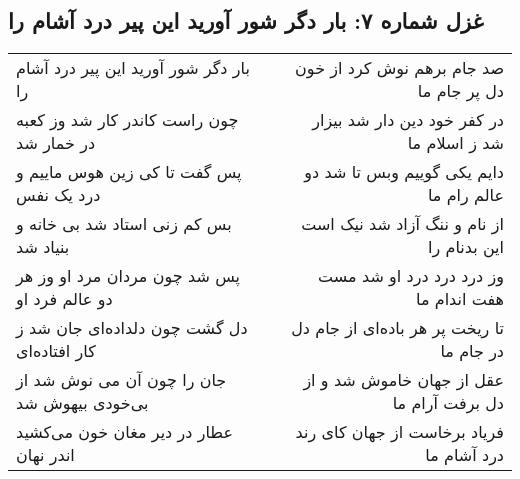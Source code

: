\begin{center}
\section*{غزل شماره ۷: بار دگر شور آورید این پیر درد آشام را}
\label{sec:007}
\begin{longtable}{l p{0.5cm} r}
بار دگر شور آورید این پیر درد آشام را
&&
صد جام برهم نوش کرد از خون دل پر جام ما
\\
چون راست کاندر کار شد وز کعبه در خمار شد
&&
در کفر خود دین دار شد بیزار شد ز اسلام ما
\\
پس گفت تا کی زین هوس ماییم و درد یک نفس
&&
دایم یکی گوییم وبس تا شد دو عالم رام ما
\\
بس کم زنی استاد شد بی خانه و بنیاد شد
&&
از نام و ننگ آزاد شد نیک است این بدنام را
\\
پس شد چون مردان مرد او وز هر دو عالم فرد او
&&
وز درد درد درد او شد مست هفت اندام ما
\\
دل گشت چون دلداده‌ای جان شد ز کار افتاده‌ای
&&
تا ریخت پر هر باده‌ای از جام دل در جام ما
\\
جان را چون آن می نوش شد از بی‌خودی بیهوش شد
&&
عقل از جهان خاموش شد و از دل برفت آرام ما
\\
عطار در دیر مغان خون می‌کشید اندر نهان
&&
فریاد برخاست از جهان کای رند درد آشام ما
\\
\end{longtable}
\end{center}
